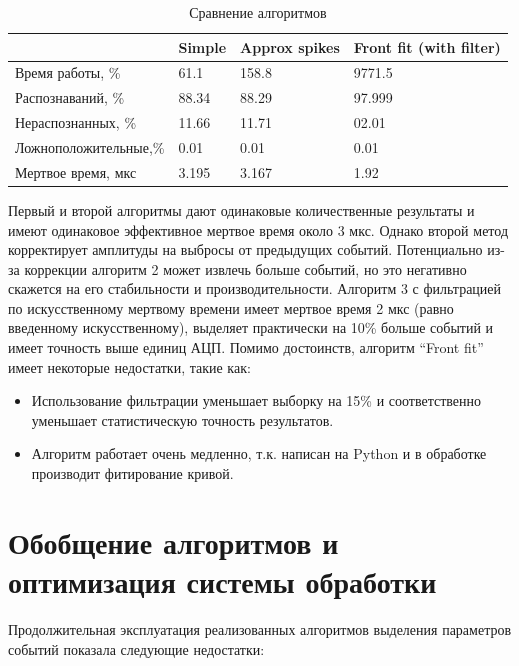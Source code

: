 \documentclass[a4paper,14pt]{extreport}
\begin{document}
\begin{table}
\centering
    \begin{tabular}{|l|l|l|l|}
        \hline
         & Simple & Approx spikes & Front fit (with filter) \\
        \hline
        Время работы, \% & 61.1 & 158.8 & 9771.5 \\
        \hline
        Распознаваний, \% & 88.34 & 88.29 & 97.999 \\
        \hline
        Нераспознанных,  \% & 11.66 & 11.71 & 02.01 \\
        \hline
        Ложноположительные,\% & 0.01 & 0.01 & 0.01 \\
        \hline
        Мертвое время, мкс & 3.195 & 3.167 & 1.92 \\ 
        \hline
    \end{tabular} 
    \caption{Сравнение алгоритмов}
    \label{tbl:methods-compare-1}
\end{table}

Первый и второй алгоритмы дают одинаковые количественные результаты и имеют одинаковое эффективное мертвое время около 3 мкс. Однако второй метод корректирует амплитуды на выбросы от предыдущих событий. Потенциально из-за коррекции алгоритм 2 может извлечь больше событий, но это негативно скажется на его стабильности и производительности. Алгоритм 3 с фильтрацией по искусственному мертвому времени имеет мертвое время 2 мкс (равно введенному искусственному), выделяет практически на 10\% больше событий и имеет точность выше единиц АЦП. Помимо достоинств, алгоритм “Front fit” имеет некоторые недостатки, такие как:

\begin{itemize}
    \item Использование фильтрации уменьшает выборку на 15\% и соответственно уменьшает статистическую точность результатов. 
    \item Алгоритм работает очень медленно, т.к. написан на Python и в обработке производит фитирование кривой.
\end{itemize}

\section{Обобщение алгоритмов и оптимизация системы обработки}

Продолжительная эксплуатация реализованных алгоритмов выделения параметров событий показала следующие недостатки:
\end{document}
